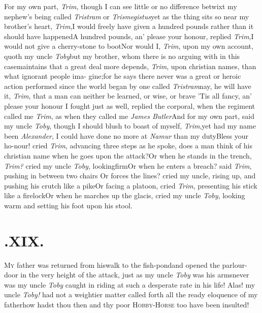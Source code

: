 \documentclass{article}
\begin{document}
\tsh For my own part, \textit{Trim}, though I can see
little or no difference betwixt my nephew’s being called \textit{Tristram} or
\textit{Trismegistus}\tsk yet as the thing sits so near my
brother’s heart, \textit{Trim},\tsh I would freely have
given a hundred pounds rather than it should have
happened\tsh A hundred pounds, an’ please your
honour,  replied \textit{Trim},\tsk I would not give a cherry-stone
to boot\tsh Nor would I, \textit{Trim}, upon my own
account, quoth my uncle \textit{Toby}\tsh but my brother,
whom there is no arguing with in this case\tsk maintains that a
great deal more depends, \textit{Trim}, upon christian names, than
what ignorant people ima- gine;\tsh for he says there never
was a great or heroic action performed since the world began by one
called \textit{Tristram}\break\tsk nay, he will have it, \textit{Trim},
that a man can neither be learned, or wise, or
brave\break
\tsk ’Tis all fancy, an’ please your honour\break
\tsk I fought just as well, replied the corporal, when the
regiment called me \textit{Trim}, as when they called me \textit{James
Butler}\tsh\break And for my own part, said my uncle\break
\textit{Toby}, though I should blush to boast of myself,
\textit{Trim},\tsk yet had my name been \textit{Alexander}, I could have done no more at
\textit{Namur} than my duty\tsk Bless your ho-\break nour! cried
\textit{Trim}, advancing three steps as he spoke, does a man think of
his christian name when he goes upon the attack?\tsk Or
when he stands in the trench, \textit{Trim?} cried my uncle
\textit{Toby}, looking\break firm\tsk Or when he enters a breach?
said \textit{Trim}, pushing in between two chairs\tsk{}
\tsk Or forces the lines? cried my uncle, rising up, and pushing his crutch
like a pike\tsk Or facing a platoon, cried \textit{Trim},
presenting his stick like a firelock\tsk Or when he
marches up the glacis, cried my uncle \textit{Toby}, looking warm and
setting his foot upon his stool.\tsh

\vspace\parskip

\section{.\enspace XIX.}

\lettrine{M}{y} father was returned from his\break walk
to the fish-pond\tsk and open\-ed the parlour-door in the
very height of the attack, just as my uncle \textit{Toby} was
 his
arms\tsk never was my uncle \textit{Toby} caught in riding at such a
desperate rate in his life! Alas! my uncle \textit{Toby!} had not a
weightier matter called forth all the ready eloquence of my
father\tsk how hadst
thou then and thy poor
\textsc{Hobby-Horse} too have been insulted!
\end{document}
